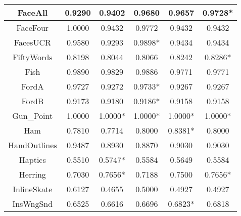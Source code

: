 \documentclass[article]{IEEEtran}
\begin{document}
\begin{table}[]
\begin{adjustbox}{width=1 \linewidth}
\begin{tabularx}{0.62 \textwidth}{|C|C|C|C|C|C|}
    \hline
    FaceAll & 0.9290 & 0.9402 & 0.9680 & 0.9657 & 0.9728* \\
    \hline
    FaceFour & 1.0000 & 0.9432 & 0.9772 & 0.9432 & 0.9432 \\
    \hline
    FacesUCR & 0.9580 & 0.9293 & 0.9898* & 0.9434 & 0.9434 \\
    \hline
    FiftyWords & 0.8198 & 0.8044 & 0.8066 & 0.8242 & 0.8286* \\
    \hline
    Fish  & 0.9890 & 0.9829 & 0.9886 & 0.9771 & 0.9771 \\
    \hline
    FordA & 0.9727 & 0.9272 & 0.9733* & 0.9267 & 0.9267 \\
    \hline
    FordB & 0.9173 & 0.9180 & 0.9186* & 0.9158 & 0.9158 \\
    \hline
    Gun\_Point & 1.0000 & 1.0000* & 1.0000* & 1.0000* & 1.0000* \\
    \hline
    Ham   & 0.7810 & 0.7714 & 0.8000 & 0.8381* & 0.8000 \\
    \hline
    HandOutlines & 0.9487 & 0.8930 & 0.8870 & 0.9030 & 0.9030 \\
    \hline
    Haptics & 0.5510 & 0.5747* & 0.5584 & 0.5649 & 0.5584 \\
    \hline
    Herring & 0.7030 & 0.7656* & 0.7188 & 0.7500 & 0.7656* \\
    \hline
    InlineSkate & 0.6127 & 0.4655 & 0.5000 & 0.4927 & 0.4927 \\
    \hline
    InsWngSnd & 0.6525 & 0.6616 & 0.6696 & 0.6823* & 0.6818 \\

\end{tabularx}
\end{adjustbox}
\end{table}
\end{document}
